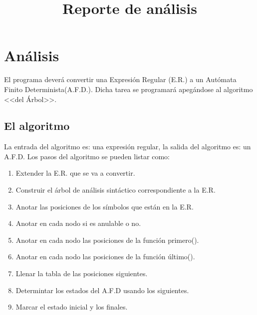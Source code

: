 \documentclass{book}
\title{Reporte de análisis}
\begin{document}
\maketitle

\chapter{Análisis}
El programa deverá convertir una Expresión Regular (E.R.) a un Autómata Finito Determinista(A.F.D.). 
Dicha tarea se programará apegándose al algoritmo <<del Árbol>>.


\section{El algoritmo}

La entrada del algoritmo es: una expresión regular, la salida del algoritmo es: un A.F.D.
Los pasos del algoritmo se pueden listar como:

\begin{enumerate}
\item Extender la E.R. que se va a convertir.
\item Construir el árbol de análisis sintáctico correspondiente a la E.R.
\item Anotar las posiciones de los símbolos que están en la E.R.
\item Anotar en cada nodo si es anulable o no.
\item Anotar en cada nodo las posiciones de la función primero().
\item Anotar en cada nodo las posiciones de la función último().
\item Llenar la tabla de las posiciones siguientes.
\item Determintar los estados del A.F.D usando los siguientes.
\item Marcar el estado inicial y los finales.
\end{enumerate}
\end{document}
